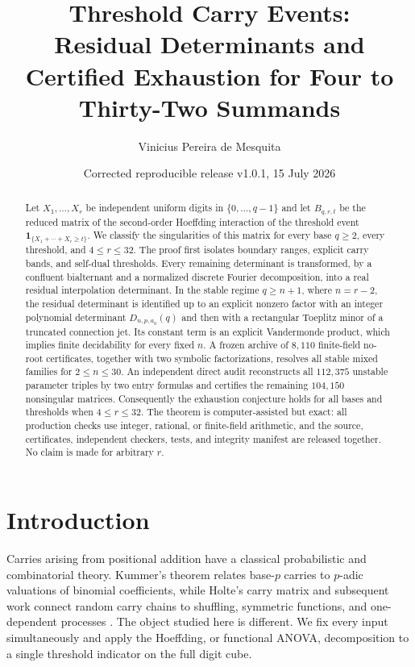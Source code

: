\documentclass[11pt]{amsart}
\title[Certified Exhaustion of Threshold Carry Events]{Threshold Carry Events:\\Residual Determinants and Certified Exhaustion for Four to Thirty-Two Summands}
\author{Vinicius Pereira de Mesquita}
\date{Corrected reproducible release v1.0.1, 15 July 2026}
\newcommand{\1}{\mathbf 1}
\theoremstyle{remark}
\begin{document}
\begin{abstract}
Let $X_1,\ldots,X_r$ be independent uniform digits in $\{0,\ldots,q-1\}$ and let $B_{q,r,t}$ be the reduced matrix of the second-order Hoeffding interaction of the threshold event $\mathbf 1_{\{X_1+\cdots+X_r\ge t\}}$. We classify the singularities of this matrix for every base $q\ge2$, every threshold, and $4\le r\le32$. The proof first isolates boundary ranges, explicit carry bands, and self-dual thresholds. Every remaining determinant is transformed, by a confluent bialternant and a normalized discrete Fourier decomposition, into a real residual interpolation determinant. In the stable regime $q\ge n+1$, where $n=r-2$, the residual determinant is identified up to an explicit nonzero factor with an integer polynomial determinant $D_{n,p,a_0}(q)$ and then with a rectangular Toeplitz minor of a truncated connection jet. Its constant term is an explicit Vandermonde product, which implies finite decidability for every fixed $n$. A frozen archive of $8{,}110$ finite-field no-root certificates, together with two symbolic factorizations, resolves all stable mixed families for $2\le n\le30$. An independent direct audit reconstructs all $112{,}375$ unstable parameter triples by two entry formulas and certifies the remaining $104{,}150$ nonsingular matrices. Consequently the exhaustion conjecture holds for all bases and thresholds when $4\le r\le32$. The theorem is computer-assisted but exact: all production checks use integer, rational, or finite-field arithmetic, and the source, certificates, independent checkers, tests, and integrity manifest are released together. No claim is made for arbitrary $r$.
\end{abstract}

\maketitle
\tableofcontents

\section{Introduction}

Carries arising from positional addition have a classical probabilistic and combinatorial theory. Kummer's theorem relates base-$p$ carries to $p$-adic valuations of binomial coefficients, while Holte's carry matrix and subsequent work connect random carry chains to shuffling, symmetric functions, and one-dependent processes \cite{Holte,DiaconisFulman,BorodinDiaconisFulman}. The object studied here is different. We fix every input simultaneously and apply the Hoeffding, or functional ANOVA, decomposition to a single threshold indicator on the full digit cube.
\end{document}
